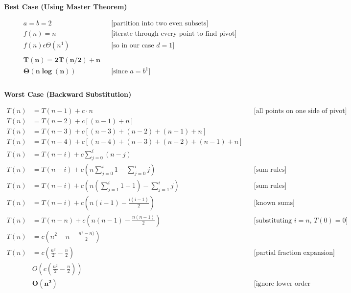 \documentclass[a4paper, 12pt]{article}
\begin{document}
{\textbf{Best Case (Using Master Theorem)}
\begin{center}
  \begin{align*}
    &a = b = 2 &&\text{[partition into two even subsets]} \\
    &f(n) = n &&\text{[iterate through every point to find pivot]} \\
    &f(n) \epsilon \Theta(n^1) &&\text{[so in our case $d=1$]} \\\\
    &\bm{T(n) = 2T(n/2) + n} \\
    &\bm{\Theta(n\log(n))} &&\text{[since $a=b^1$]} \\\\
  \end{align*}
\end{center}
\vspace{10cm}
\textbf{Worst Case (Backward Substitution)} 
\begin{center}
  \begin{align*}
    T(n) &= T(n-1) + c\cdot n &&\text{[all points on one side of pivot]} \\
    T(n) &= T(n-2) + c[(n-1) + n] \\
    T(n) &= T(n-3) + c[(n-3) + (n-2) + (n-1) + n] \\
    T(n) &= T(n-4) + c[(n-4) + (n-3) + (n-2) + (n-1) + n] \\
    T(n) &= T(n-i) + c\sum\limits_{j=0}^i (n-j) \\ 
    T(n) &= T(n-i) + c(n\sum\limits_{j=0}^i1 - \sum\limits_{j=0}^i j) &&\text{[sum rules]}\\ 
    T(n) &= T(n-i) + c(n(\sum\limits_{j=1}^i1 - 1)  - \sum\limits_{j=1}^i j) &&\text{[sum rules]}\\ 
    T(n) &= T(n-i) + c(n(i - 1)  - \frac{i(i-1)}{2}) &&\text{[known sums]}\\ 
    T(n) &= T(n-n) + c(n(n - 1)  - \frac{n(n-1)}{2}) &&\text{[substituting $i=n$, $T(0)=0$]}\\ 
    T(n) &= c(n^2 - n  - \frac{n^2-n)}{2}) \\ 
    T(n) &= c(\frac{n^2}{2} - \frac{n}{2}) &&\text{[partial fraction expansion]}\\ 
         &O(c(\frac{n^2}{2} - \frac{n}{2})) \\
         &\bm{O(n^2)} &&\text{[ignore lower order terms/constants]} \\
  \end{align*}
\end{center}

}
\end{document}

